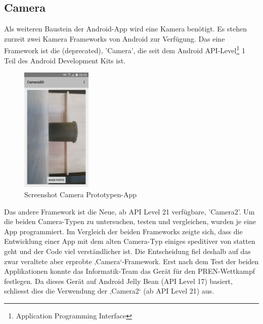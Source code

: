 \subsection{Camera}
Als weiteren Baustein der Android-App wird eine Kamera benötigt. Es stehen zurzeit 
zwei Kamera Frameworks von Android zur Verfügung. Das eine Framework ist die (deprecated)‚ 
'Camera', die seit dem Android API-Level\footnote{Application Programming Interface} 1 Teil des 
Android Development Kits ist.
\newline
\begin{figure}[h!]
	\includegraphics[width=0.3\textwidth,clip,trim=0mm 0mm 0mm 0mm]
	{Enddokumentation/Bilder/Screenshot_CameraSD.png}
	\centering
	\caption{Screenshot Camera Prototypen-App}
	\label{abb:ScreenshotCameraSD}
\end{figure}
Das andere Framework ist die Neue, ab API Level 21 verfügbare‚ 
'Camera2'. Um die beiden Camera-Typen zu untersuchen, testen und vergleichen, wurden je eine App programmiert.
Im Vergleich der beiden Frameworks zeigte sich, dass die Entwicklung einer App mit dem alten Camera-Typ 
einiges speditiver von statten geht und der Code viel verständlicher ist. Die Entscheidung fiel deshalb 
auf das zwar veraltete aber erprobte ‚Camera‘-Framework.
\newline
\newline
Erst nach dem Test der beiden Applikationen konnte das Informatik-Team das Gerät für den PREN-Wettkampf festlegen. 
Da dieses Gerät auf Android Jelly Bean (API Level 17) basiert, schliesst dies die Verwendung 
der ‚Camera2‘ (ab API Level 21) aus.
